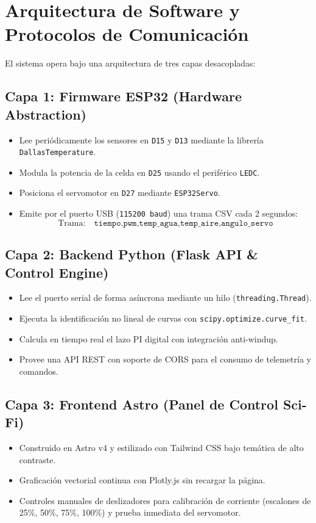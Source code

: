 \documentclass[11pt,letterpaper]{article}
\begin{document}
\section{Arquitectura de Software y Protocolos de Comunicación}

El sistema opera bajo una arquitectura de tres capas desacopladas:

\subsection{Capa 1: Firmware ESP32 (Hardware Abstraction)}
\begin{itemize}
    \item Lee periódicamente los sensores en \texttt{D15} y \texttt{D13} mediante la librería \texttt{DallasTemperature}.
    \item Modula la potencia de la celda en \texttt{D25} usando el periférico \texttt{LEDC}.
    \item Posiciona el servomotor en \texttt{D27} mediante \texttt{ESP32Servo}.
    \item Emite por el puerto USB (\texttt{115200 baud}) una trama CSV cada 2 segundos:
    $$\text{Trama:} \quad \texttt{tiempo,pwm,temp\_agua,temp\_aire,angulo\_servo}$$
\end{itemize}

\subsection{Capa 2: Backend Python (Flask API \& Control Engine)}
\begin{itemize}
    \item Lee el puerto serial de forma asíncrona mediante un hilo (\texttt{threading.Thread}).
    \item Ejecuta la identificación no lineal de curvas con \texttt{scipy.optimize.curve\_fit}.
    \item Calcula en tiempo real el lazo PI digital con integración anti-windup.
    \item Provee una API REST con soporte de CORS para el consumo de telemetría y comandos.
\end{itemize}

\subsection{Capa 3: Frontend Astro (Panel de Control Sci-Fi)}
\begin{itemize}
    \item Construido en Astro v4 y estilizado con Tailwind CSS bajo temática de alto contraste.
    \item Graficación vectorial continua con Plotly.js sin recargar la página.
    \item Controles manuales de deslizadores para calibración de corriente (escalones de 25\%, 50\%, 75\%, 100\%) y prueba inmediata del servomotor.
\end{itemize}
\end{document}
